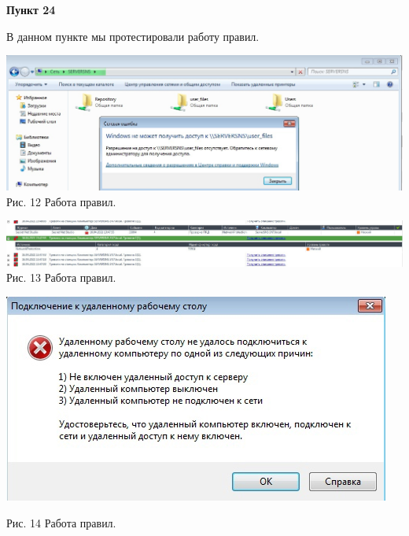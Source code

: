 \documentclass[a4paper,14pt]{extarticle}
\begin{document}
    \newpage
    \textbf{Пункт 24}
    \vspace{-3ex}
    \begin{center}
        \singlespacing
        В данном пункте мы протестировали работу правил.

        \includegraphics[scale=0.35]{pics/24_1.jpg}\\

        Рис. 12 Работа правил.

        \includegraphics[scale=0.25]{pics/24_2.jpg}\\

        Рис. 13 Работа правил.

        \includegraphics[scale=0.6]{pics/24_3.jpg}

        Рис. 14 Работа правил.
    \end{center}
\end{document}
